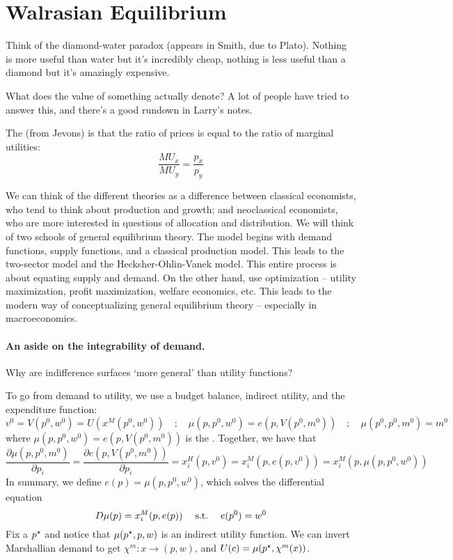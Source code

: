 \documentclass[10pt]{article}
\begin{document}
\section{Walrasian Equilibrium}

\begin{remark}
	Think of the diamond-water paradox (appears in Smith, due to Plato). Nothing is more useful than water but it's incredibly cheap, nothing is less useful than a diamond but it's amazingly expensive. 
\end{remark}

\begin{question}
	What does the value of something actually denote? A lot of people have tried to answer this, and there's a good rundown in Larry's notes. 
\end{question}
\begin{definition}
	The  (from Jevons) is that the ratio of prices is equal to the ratio of marginal utilities:
	\[\frac{MU_x}{MU_y} = \frac{p_x}{p_y}\]
\end{definition}

We can think of the different theories as a difference between classical economists, who tend to think about production and growth; and neoclassical economists, who are more interested in questions of allocation and distribution. We will think of two schools of general equilibrium theory. The  model begins with demand functions, supply functions, and a classical production model. This leads to the two-sector model and the Hecksher-Ohlin-Vanek model. This entire process is about equating supply and demand. On the other hand,  use optimization -- utility maximization, profit maximization, welfare economics, etc. This leads to the modern way of conceptualizing general equilibrium theory -- especially in macroeconomics.

\paragraph{An aside on the integrability of demand.}

\begin{question}
	Why are indifference surfaces `more general' than utility functions?
\end{question}

To go from demand to utility, we use a budget balance, indirect utility, and the expenditure function:
\[v^0 = V(p^0,w^0) = U(x^M(p^0,w^0)) \quad ; \quad \mu(p,p^0,w^0) = e(p,V(p^0,m^0)) \quad ; \quad \mu(p^0,p^0,m^0) = m^0\]
where $\mu(p,p^0,w^0) = e(p,V(p^0,m^0))$ is the . Together, we have that\[\frac{\partial \mu(p,p^0,m^0)}{\partial p_i} = \frac{\partial e(p,V(p^0,m^0))}{\partial p_i} = x^H_i(p,v^0) = x^M_i(p,e(p,v^0)) = x^M_i(p,\mu(p,p^0,w^0))\]In summary, we define $e(p) = \mu(p,p^0,w^0)$, which solves the differential equation \[D\mu(p) = x^M_i(p,e(p)) \quad \;\text{s.t.}\; \quad e(p^0) = w^0\]Fix a $p^\star$ and notice that $\mu(p^\star,p,w)$ is an indirect utility function. We can invert Marshallian demand to get $\chi^m: x \to (p,w)$, and $U(c) = \mu(p^\star, \chi^m(x))$.
\end{document}
